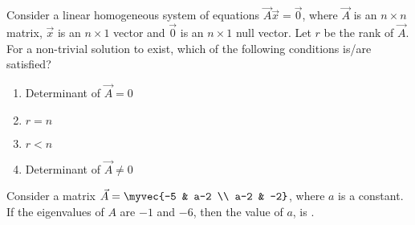 		\item Consider a linear homogeneous system of equations $\vec{A}\vec{x} = \vec{0}$, where $\vec{A}$ is an $n \times n$ matrix, $\vec{x}$ is an $n \times 1$ vector and $\vec{0}$ is an $n \times 1$ null vector. Let $r$ be the rank of $\vec{A}$. For a non-trivial solution to exist, which of the following conditions is/are satisfied?
		\hfill{}
		\begin{multicols}{2}
		\begin{enumerate}
			\item Determinant of $\vec{A} = 0$
			\item $r=n$
			\item $r < n$
			\item Determinant of $\vec{A} \ne 0$
		\end{enumerate}
	\end{multicols}
		\item Consider a matrix $\vec{A} = \myvec{-5 & a-2 \\ a-2 & -2}$, where $a$ is a constant. If the eigenvalues of $A$ are $-1$ and $-6$, then the value of $a$,  is \underline{\hspace{1cm}}.
		\hfill{}
